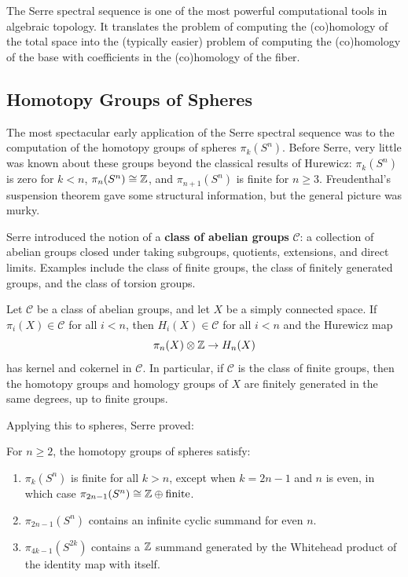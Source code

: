 The Serre spectral sequence is one of the most powerful computational tools in algebraic topology. It translates the problem of computing the (co)homology of the total space into the (typically easier) problem of computing the (co)homology of the base with coefficients in the (co)homology of the fiber.

\subsection{Homotopy Groups of Spheres}

The most spectacular early application of the Serre spectral sequence was to the computation of the homotopy groups of spheres \(\pi_k(S^n)\). Before Serre, very little was known about these groups beyond the classical results of Hurewicz: \(\pi_k(S^n)\) is zero for \(k < n\), \(\pi_n(S^n) \cong \mathbb{Z}\), and \(\pi_{n+1}(S^n)\) is finite for \(n \geq 3\). Freudenthal's suspension theorem gave some structural information, but the general picture was murky.

Serre introduced the notion of a \textbf{class of abelian groups} \(\mathcal{C}\): a collection of abelian groups closed under taking subgroups, quotients, extensions, and direct limits. Examples include the class of finite groups, the class of finitely generated groups, and the class of torsion groups.

\begin{theorem}
Let \(\mathcal{C}\) be a class of abelian groups, and let \(X\) be a simply connected space. If \(\pi_i(X) \in \mathcal{C}\) for all \(i < n\), then \(H_i(X) \in \mathcal{C}\) for all \(i < n\) and the Hurewicz map
\[
\pi_n(X) \otimes \mathbb{Z} \to H_n(X)
\]
has kernel and cokernel in \(\mathcal{C}\). In particular, if \(\mathcal{C}\) is the class of finite groups, then the homotopy groups and homology groups of \(X\) are finitely generated in the same degrees, up to finite groups.
\end{theorem}

Applying this to spheres, Serre proved:

\begin{theorem}[Serre, 1951]
For \(n \geq 2\), the homotopy groups of spheres satisfy:
\begin{enumerate}
    \item \(\pi_k(S^n)\) is finite for all \(k > n\), except when \(k = 2n-1\) and \(n\) is even, in which case \(\pi_{2n-1}(S^n) \cong \mathbb{Z} \oplus \text{finite}\).
    \item \(\pi_{2n-1}(S^n)\) contains an infinite cyclic summand for even \(n\).
    \item \(\pi_{4k-1}(S^{2k})\) contains a \(\mathbb{Z}\) summand generated by the Whitehead product of the identity map with itself.
\end{enumerate}
\end{theorem}

